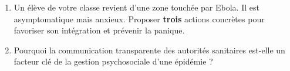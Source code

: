 \documentclass[11pt]{article}
\begin{document}
\begin{exercice}
\begin{enumerate}
    \item Un élève de votre classe revient d'une zone touchée par Ebola. Il est asymptomatique mais anxieux. Proposer \textbf{trois} actions concrètes pour favoriser son intégration et prévenir la panique.
    \item Pourquoi la communication transparente des autorités sanitaires est-elle un facteur clé de la gestion psychosociale d'une épidémie ?
\end{enumerate}
\end{exercice}
\end{document}
